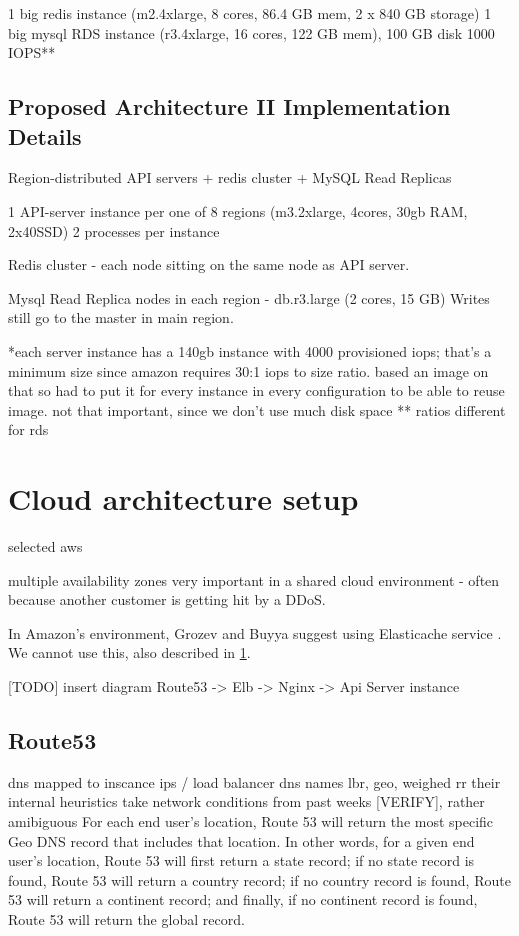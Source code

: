\documentclass{uvamscse}
\begin{document}
1 big redis instance (m2.4xlarge, 8 cores, 86.4 GB mem, 2 x 840 GB storage)
1 big mysql RDS instance (r3.4xlarge, 16 cores, 122 GB mem), 100 GB disk 1000 IOPS**

\subsection{Proposed Architecture II Implementation Details}\label{Proposed Architecture II Implementation Details}
Region-distributed API servers + redis cluster + MySQL Read Replicas

1 API-server instance per one of 8 regions (m3.2xlarge, 4cores, 30gb RAM, 2x40SSD)
2 processes per instance

Redis cluster - each node sitting on the same node as API server.

Mysql Read Replica nodes in each region - db.r3.large (2 cores, 15 GB)
Writes still go to the master in main region.

*each server instance has a 140gb instance with 4000 provisioned iops; that's a minimum size since amazon requires 30:1 iops to size ratio. based an image on that so had to put it for every instance in every configuration to be able to reuse image. not that important, since we don't use much disk space
** ratios different for rds

\section{Cloud architecture setup} \label{Cloud architecture setup}

selected aws

multiple availability zones very important in a shared cloud environment - often because another customer is getting hit by a DDoS.\cite{GroBuy}

In Amazon’s environment, Grozev and Buyya suggest using Elasticache service \cite{GroBuy}. We cannot use this, also described in \ref{Cloud architecture setup}.

[TODO] insert diagram
Route53 -> Elb -> Nginx -> Api Server instance

\subsection{Route53}
  dns mapped to inscance ips / load balancer dns names
  lbr, geo, weighed rr
  their internal heuristics take network conditions from past weeks [VERIFY], rather amibiguous
  For each end user’s location, Route 53 will return the most specific Geo DNS record that includes that location. In other words, for a given end user’s location, Route 53 will first return a state record; if no state record is found, Route 53 will return a country record; if no country record is found, Route 53 will return a continent record; and finally, if no continent record is found, Route 53 will return the global record.
\end{document}
